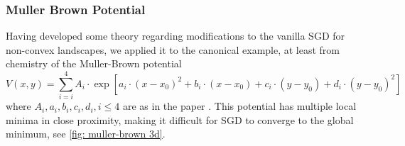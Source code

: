 \documentclass{article}
\theoremstyle{mystyle}
\begin{document}
\newpage
\subsubsection{Muller Brown Potential}

Having developed some theory regarding modifications to the vanilla SGD for non-convex landscapes, we applied it to the canonical example, at least from chemistry \cite{muller1979location} of the Muller-Brown potential 
\begin{equation}
	V(x,y) = \displaystyle\sum^{4}_{i=i}A_{i}\cdot \exp[a_{i}\cdot(x-x_{0})^{2}+b_{i}\cdot(x-x_{0})+c_{i}\cdot(y-y_{0})+d_{i}\cdot (y-y_{0})^{2}] 
\end{equation}
where $A_{i}, a_{i}, b_{i}, c_{i}, d_{i}, i\leq 4$ are as in the paper \cite{muller1979location}. This potential has multiple local minima in close proximity, making it difficult for SGD to converge to the global minimum, see \ref{fig: muller-brown 3d}.
\end{document}
